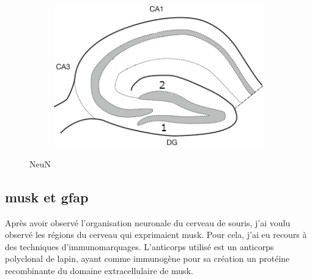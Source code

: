 \begin{figure}[h]
\begin{center}
\begin{subfigure}[h]{0.329\textwidth}
			\end{subfigure}
			\begin{subfigure}[h]{0.329\textwidth}
				\caption{}
				\label{fig:hippIllu}
				\includegraphics[width=\textwidth]{./Images/HippSchema.jpg}
			\end{subfigure}
			\begin{subfigure}[h]{0.49\textwidth}
			\end{subfigure}
		\end{center}
		\caption{NeuN}
		\label{fig:NeuNResultat}
	\end{figure}
	
	\subsection{\acrshort{musk} et \acrshort{gfap}}
	\label{ssec:musk}
	Après avoir observé l'organisation neuronale du cerveau de souris, j'ai voulu observé les régions du cerveau qui exprimaient \gls{musk}. Pour cela, j'ai eu recours à des techniques d'immunomarquages. L'anticorps utilisé est un anticorps polyclonal de lapin, ayant comme immunogène pour sa création un protéine recombinante du domaine extracellulaire de \gls{musk}.
	
